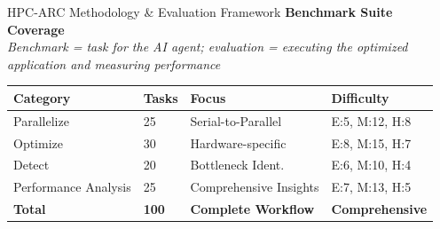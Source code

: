 \documentclass[compress,aspectratio=169]{beamer}
\begin{document}
\begin{frame}{HPC-ARC Methodology \& Evaluation Framework}
    \textbf{Benchmark Suite Coverage}\\
    \scriptsize\textit{Benchmark = task for the AI agent; evaluation = executing the optimized application and measuring performance}
    \begin{table}
        \centering
        \tiny
        \begin{tabular}{@{}llll@{}}
            \toprule
            \textbf{Category} & \textbf{Tasks} & \textbf{Focus} & \textbf{Difficulty} \\
            \midrule
            Parallelize & 25 & Serial-to-Parallel & E:5, M:12, H:8 \\
            Optimize & 30 & Hardware-specific & E:8, M:15, H:7 \\
            Detect & 20 & Bottleneck Ident. & E:6, M:10, H:4 \\
            Performance Analysis & 25 & Comprehensive Insights & E:7, M:13, H:5 \\
            \toprule
            \textbf{Total} & \textbf{100} & \textbf{Complete Workflow} & \textbf{Comprehensive} \\
            \bottomrule
        \end{tabular}
    \end{table}
\end{frame}
\end{document}
